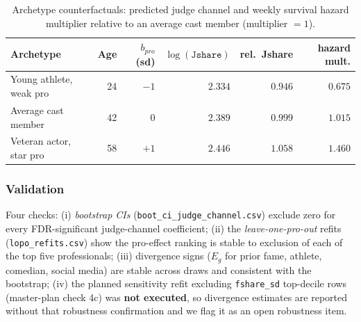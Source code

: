 \begin{table}[H]
\centering
\caption{Archetype counterfactuals: predicted judge channel and weekly survival hazard
multiplier relative to an average cast member (multiplier $= 1$).}
\label{tab:archetypes}
\small
\begin{tabular}{lrrrrr}
\toprule
Archetype & Age & $b_{pro}$ (sd) & $\log(\texttt{Jshare})$ & rel.\ Jshare & hazard mult.\\
\midrule
Young athlete, weak pro & 24 & $-1$ & $2.334$ & $0.946$ & $\mathbf{0.675}$\\
Average cast member & 42 & $0$ & $2.389$ & $0.999$ & $1.015$\\
Veteran actor, star pro & 58 & $+1$ & $2.446$ & $1.058$ & $\mathbf{1.460}$\\
\bottomrule
\end{tabular}
\end{table}

\subsubsection{Validation}

Four checks: (i) \emph{bootstrap CIs} (\texttt{boot\_ci\_judge\_channel.csv}) exclude
zero for every FDR-significant judge-channel coefficient; (ii) the
\emph{leave-one-pro-out} refits (\texttt{lopo\_refits.csv}) show the pro-effect ranking
is stable to exclusion of each of the top five professionals; (iii) divergence signs
($E_g$ for prior fame, athlete, comedian, social media) are stable across draws and
consistent with the bootstrap; (iv) the planned sensitivity refit excluding
\texttt{fshare\_sd} top-decile rows (master-plan check 4c) was \textbf{not executed},
so divergence estimates are reported without that robustness confirmation and we flag
it as an open robustness item.
